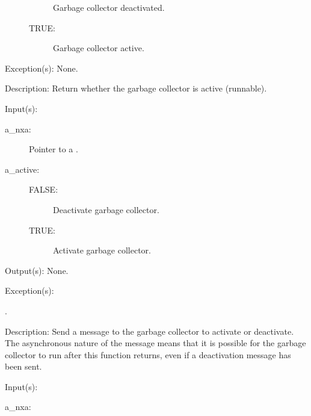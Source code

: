 \begin{capi}
\begin{capilist}
\begin{description}
\begin{description}
				Garbage collector deactivated.
			\item[TRUE: ]
				Garbage collector active.
			\end{description}
		\end{description}
	\item[Exception(s): ] None.
	\item[Description: ]
		Return whether the garbage collector is active (runnable).
	\end{capilist}
\label{nxa_active_set}
	\begin{capilist}
	\item[Input(s): ]
		\begin{description}\item[]
		\item[a\_nxa: ]
			Pointer to a .
		\item[a\_active: ]
			\begin{description}\item[]
			\item[FALSE: ]
				Deactivate garbage collector.
			\item[TRUE: ]
				Activate garbage collector.
			\end{description}
		\end{description}
	\item[Output(s): ] None.
	\item[Exception(s): ]
		\begin{description}\item[]
		\item[.]
		\end{description}
	\item[Description: ]
		Send a message to the garbage collector to activate or
		deactivate.  The asynchronous nature of the message means that
		it is possible for the garbage collector to run after this
		function returns, even if a deactivation message has been sent.
	\end{capilist}
\label{nxa_period_get}
	\begin{capilist}
	\item[Input(s): ]
		\begin{description}\item[]
		\item[a\_nxa: ]

\end{description}
\end{capilist}
\end{capi}
